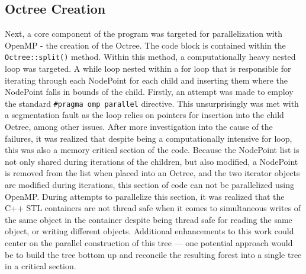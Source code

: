 \documentclass[11pt]{article}
\begin{document}
\subsection{Octree Creation}
Next, a core component of the program was targeted for parallelization with OpenMP - the creation of the Octree. The code block is contained within the \texttt{Octree::split()} method. Within this method, a computationally heavy nested loop was targeted. A while loop nested within a for loop that is responsible for iterating through each NodePoint for each child and inserting them where the NodePoint falls in bounds of the child. Firstly, an attempt was made to employ the standard \texttt{\#pragma omp parallel} directive. This unsurprisingly was met with a segmentation fault as the loop relies on pointers for insertion into the child Octree, among other issues. After more investigation into the cause of the failures, it was realized that despite being a computationally intensive for loop, this was also a memory critical section of the code. Because the NodePoint list is not only shared during iterations of the children, but also modified, a NodePoint is removed from the list when placed into an Octree, and the two iterator objects are modified during iterations, this section of code can not be parallelized using OpenMP. During attempts to parallelize this section, it was realized that the C++ STL containers are not thread safe when it comes to simultaneous writes of the same object in the container despite being thread safe for reading the same object, or writing different objects. Additional enhancements to this work could center on the parallel construction of this tree --- one potential approach would be to build the tree bottom up and reconcile the resulting forest into a single tree in a critical section.
\end{document}
